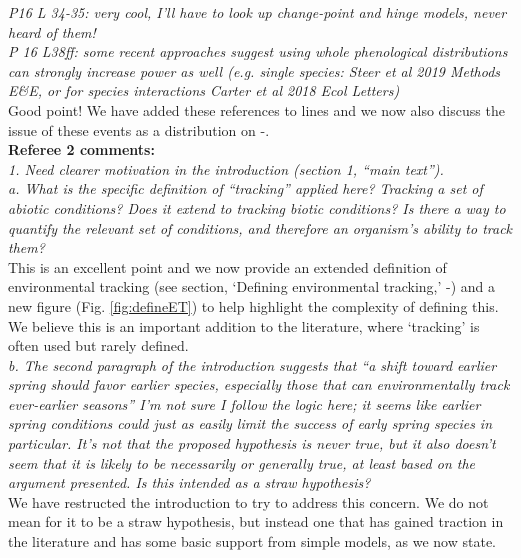 \documentclass[11pt]{article}
\begin{document}
\emph{P16 L 34-35: very cool, I'll have to look up change-point and hinge models, never heard of
them!}\\

\emph{P 16 L38ff: some recent approaches suggest using whole phenological distributions can
strongly increase power as well (e.g. single species: Steer et al 2019 Methods E\&E, or for
species interactions Carter et al 2018 Ecol Letters)}\\

Good point! We have added these references to lines  and we now also discuss the issue of these events as a distribution on -. \\

{\bf Referee 2 comments:} \\


\emph{1.      Need clearer motivation in the introduction (section 1, ``main text'').\\
a.      What is the specific definition of “tracking” applied here? Tracking a set of abiotic
conditions? Does it extend to tracking biotic conditions? Is there a way to quantify the
relevant set of conditions, and therefore an organism's ability to track them?}\\

This is an excellent point and we now provide an extended definition of environmental tracking (see section, `Defining environmental tracking,' -) and a new figure (Fig. \ref{fig:defineET}) to help highlight the complexity of defining this. We believe this is an important addition to the literature, where `tracking' is often used but rarely defined. \\
 
\emph{b.      The second paragraph of the introduction suggests that ``a shift toward earlier spring
should favor earlier species, especially those that can environmentally track ever-earlier
seasons'' I'm not sure I follow the logic here; it seems like earlier spring conditions could
just as easily limit the success of early spring species in particular. It's not that the
proposed hypothesis is never true, but it also doesn't seem that it is likely to be
necessarily or generally true, at least based on the argument presented. Is this intended as
a straw hypothesis?}\\

We have restructed the introduction to try to address this concern. We do not mean for it to be a straw hypothesis, but instead one that has gained traction in the literature and has some basic support from simple models, as we now state.\\
\end{document}
